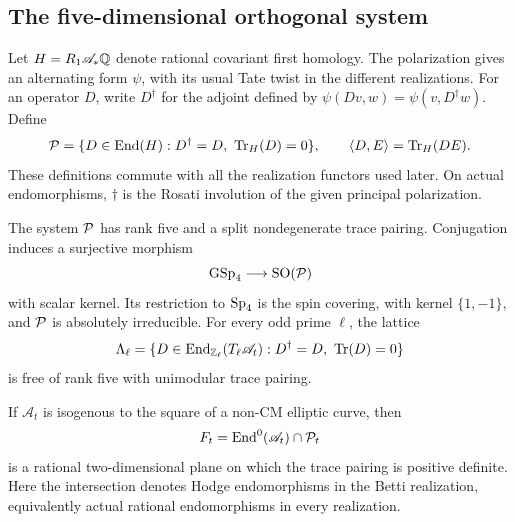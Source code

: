 \subsection{The five-dimensional orthogonal system}

Let $H=R_1\mathscr A_*\mathbb Q$ denote rational covariant first homology.
The polarization gives an alternating form $\psi$, with its usual
Tate twist in the different realizations.  For an operator $D$, write
$D^\dagger$ for the adjoint defined by
$\psi(Dv,w)=\psi(v,D^\dagger w)$.  Define
\begin{equation}\label{geo:operator-space}
 \mathcal P=\{D\in\operatorname{End}(H):D^\dagger=D,\ \operatorname{Tr}_H(D)=0\},
 \qquad \langle D,E\rangle=\operatorname{Tr}_H(DE).
\end{equation}
These definitions commute with all the realization functors used
later.  On actual endomorphisms, $\dagger$ is the Rosati involution
of the given principal polarization.

\begin{proposition}\label{geo:five-space}
The system $\mathcal P$ has rank five and a split nondegenerate trace pairing.
Conjugation induces a surjective morphism
\[
 \operatorname{GSp}_4\longrightarrow\operatorname{SO}(\mathcal P)
\]
with scalar kernel.  Its restriction to $\operatorname{Sp}_4$ is the spin covering,
with kernel $\{1,-1\}$, and $\mathcal P$ is absolutely irreducible.
For every odd prime $\ell$, the lattice
\begin{equation}\label{geo:integral-lattice}
 \Lambda_\ell=
 \{D\in\operatorname{End}_{\mathbb Z_\ell}(T_\ell\mathscr A_t):
       D^\dagger=D,\ \operatorname{Tr}(D)=0\}
\end{equation}
is free of rank five with unimodular trace pairing.

If $\mathscr A_t$ is isogenous to the square of a non-CM elliptic
curve, then
\begin{equation}\label{geo:hodge-plane}
 F_t=\operatorname{End}^0(\mathscr A_t)\cap\mathcal P_t
\end{equation}
is a rational two-dimensional plane on which the trace pairing is
positive definite.  Here the intersection denotes Hodge
endomorphisms in the Betti realization, equivalently actual rational
endomorphisms in every realization.
\end{proposition}

